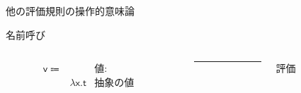 \documentclass[9pt]{beamer}
\begin{document}
    \begin{frame}{他の評価規則の操作的意味論}
        \begin{block}{名前呼び}
        \begin{columns}
            \begin{column}{0.48\textwidth}
                \begin{align*}
                \mathsf{v}\Coloneq& &\text{値:}\\
                    &\lambda \mathsf{x}.\mathsf{t}&\text{抽象の値}&
                \end{align*}
            \end{column}
            \begin{column}{.02\textwidth}
                \rule{.1mm}{0.5\textheight}
            \end{column}
            \begin{column}{0.48\textwidth}
                評価
                \begin{prooftree}
                \end{prooftree}
                \begin{prooftree}
                \end{prooftree}
            \end{column}
        \end{columns}
        \end{block}
        \end{frame}
\end{document}
